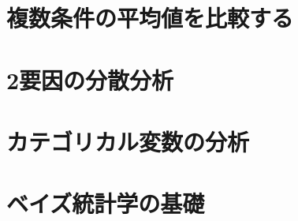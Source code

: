 \documentclass[
]{book}
\begin{document}
\hypertarget{ux8907ux6570ux6761ux4ef6ux306eux5e73ux5747ux5024ux3092ux6bd4ux8f03ux3059ux308b}{%
\chapter{複数条件の平均値を比較する}\label{ux8907ux6570ux6761ux4ef6ux306eux5e73ux5747ux5024ux3092ux6bd4ux8f03ux3059ux308b}}

\hypertarget{ux8981ux56e0ux306eux5206ux6563ux5206ux6790}{%
\chapter{2要因の分散分析}\label{ux8981ux56e0ux306eux5206ux6563ux5206ux6790}}

\hypertarget{ux30abux30c6ux30b4ux30eaux30abux30ebux5909ux6570ux306eux5206ux6790}{%
\chapter{カテゴリカル変数の分析}\label{ux30abux30c6ux30b4ux30eaux30abux30ebux5909ux6570ux306eux5206ux6790}}

\hypertarget{ux30d9ux30a4ux30baux7d71ux8a08ux5b66ux306eux57faux790e}{%
\chapter{ベイズ統計学の基礎}\label{ux30d9ux30a4ux30baux7d71ux8a08ux5b66ux306eux57faux790e}}

  
\end{document}
